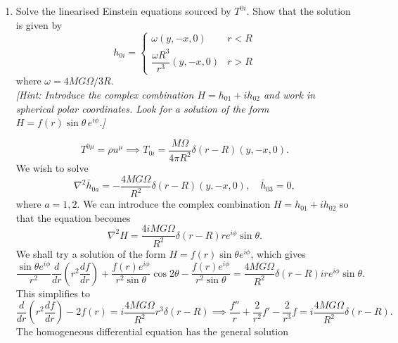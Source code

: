 \begin{enumerate}[label=\roman*)]
    \item Solve the linearised Einstein equations sourced by $T^{0i}$. Show that the solution is given by
    \begin{equation}
        h_{0i} = \begin{cases} \omega(y,-x,0) & r < R \\ \dfrac{\omega R^3}{r^3}(y,-x,0) & r > R \end{cases}
    \end{equation}
    where $\omega = 4MG\Omega/3R$.\\
    \textit{[Hint: Introduce the complex combination $H = h_{01}+ih_{02}$ and work in spherical polar coordinates. Look for a solution of the form $H = f(r)\sin\theta\, e^{i\phi}$.]}

    \begin{solution}
        \begin{equation}
            T^{0\mu} = \rho u^\mu \implies T_{0i} = \frac{M\Omega}{4\pi R^2}\delta(r-R)(y,-x,0).
        \end{equation}
        We wish to solve
        \begin{equation}
            \nabla^2 \bar h_{0a} = -\frac{4MG\Omega}{ R^2}\delta(r-R)(y,-x,0), \quad \bar h_{03} = 0,
        \end{equation}
        where $a=1,2$. We can introduce the complex combination $H = h_{01} + ih_{02}$ so that the equation becomes
        \begin{equation}
            \nabla^2 H = \frac{4iMG\Omega}{R^2}\delta(r-R) re^{i\phi}\sin\theta.
        \end{equation}
        We shall try a solution of the form $H = f(r)\sin\theta e^{i\phi}$, which gives
        \begin{equation}
            \frac{\sin\theta e^{i\phi}}{r^2}\frac{d}{dr}\left(r^2\frac{df}{dr}\right) + \frac{f(r)e^{i\phi}}{r^2\sin\theta}\cos2\theta - \frac{f(r)e^{i\phi}}{r^2\sin\theta} = \frac{4MG\Omega}{ R^2}\delta(r-R) ire^{i\phi}\sin\theta.
        \end{equation}
        This simplifies to 
        \begin{equation}
            \frac{d}{dr}\left(r^2\frac{df}{dr}\right) - 2f(r) = i\frac{4MG\Omega}{R^2}r^3\delta(r-R) \implies \frac{f''}{r} + \frac{2}{r^2}f' - \frac{2}{r^3}f = i\frac{4MG\Omega}{ R^2}\delta(r-R).     
        \end{equation}
        The homogeneous differential equation has the general solution
        \begin{equation}

\end{equation}
\end{solution}
\end{enumerate}
